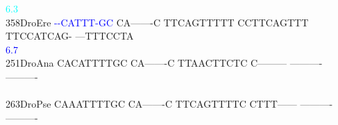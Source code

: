 \documentclass[11pt,twoside,reqno,a4paper]{article}
\begin{document}
{\hspace*{4\charwidth}\hspace*{7\charwidth}\hspace*{0\charwidth}\textcolor{cyan}{6.3}\hspace*{1\charwidth}\hspace*{1\charwidth}\hspace*{1\charwidth}\hspace*{1\charwidth}\hspace*{1\charwidth}\hspace*{1\charwidth}\\
358\hspace*{1\charwidth}DroEre	\textcolor{blue}{-}\textcolor{blue}{-}\textcolor{blue}{C}\textcolor{blue}{A}\textcolor{blue}{T}\textcolor{blue}{T}\textcolor{blue}{T}\textcolor{blue}{-}\textcolor{blue}{G}\textcolor{blue}{C}	CA-------C	TTCAGTTTTT	CCTTCAGTTT	TTCCATCAG-	---TTTCCTA	\\
\hspace*{4\charwidth}\hspace*{7\charwidth}\hspace*{0\charwidth}\textcolor{blue}{6.7}\hspace*{1\charwidth}\hspace*{1\charwidth}\hspace*{1\charwidth}\hspace*{1\charwidth}\hspace*{1\charwidth}\hspace*{1\charwidth}\\
251\hspace*{1\charwidth}DroAna	CACATTTTGC	CA-------C	TTAACTTCTC	C---------	----------	----------	\\
\hspace*{4\charwidth}\hspace*{7\charwidth}\hspace*{1\charwidth}\hspace*{1\charwidth}\hspace*{1\charwidth}\hspace*{1\charwidth}\hspace*{1\charwidth}\hspace*{1\charwidth}\\
263\hspace*{1\charwidth}DroPse	CAAATTTTGC	CA-------C	TTCAGTTTTC	CTTT------	----------	----------	\\
\hspace*{4\charwidth}\hspace*{7\charwidth}\hspace*{1\charwidth}\hspace*{1\charwidth}\hspace*{1\charwidth}\hspace*{1\charwidth}\hspace*{1\charwidth}\hspace*{1\charwidth}\\
}
\end{document}
